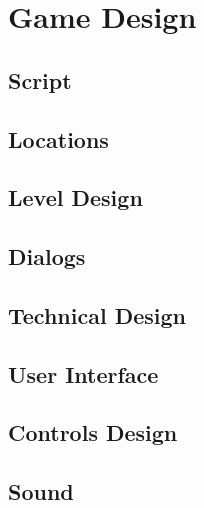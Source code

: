\documentclass{article}
\begin{document}
\section{Game Design}
\subsection{Script}
\subsection{Locations}
\subsection{Level Design}
\subsection{Dialogs}
\subsection{Technical Design}
\subsection{User Interface}
\subsection{Controls Design}
\subsection{Sound}
\end{document}

